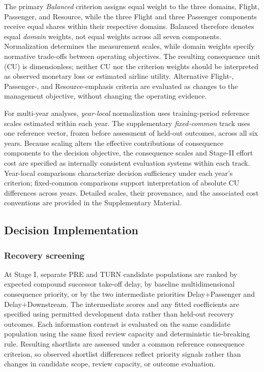The primary \emph{Balanced} criterion assigns equal weight to the three domains, Flight, Passenger, and Resource, while the three Flight and three Passenger components receive equal shares within their respective domains. Balanced therefore denotes equal \emph{domain} weights, not equal weights across all seven components. Normalization determines the measurement scales, while domain weights specify normative trade-offs between operating objectives. The resulting consequence unit (CU) is dimensionless; neither CU nor the criterion weights should be interpreted as observed monetary loss or estimated airline utility. Alternative Flight-, Passenger-, and Resource-emphasis criteria are evaluated as changes to the management objective, without changing the operating evidence.

For multi-year analyses, \emph{year-local} normalization uses training-period reference scales estimated within each year. The supplementary \emph{fixed-common} track uses one reference vector, frozen before assessment of held-out outcomes, across all six years. Because scaling alters the effective contributions of consequence components to the decision objective, the consequence scales and Stage-II effort cost are specified as internally consistent evaluation systems within each track. Year-local comparisons characterize decision sufficiency under each year's criterion; fixed-common comparisons support interpretation of absolute CU differences across years. Detailed scales, their provenance, and the associated cost conventions are provided in the Supplementary Material.

\subsection{Decision Implementation}
\label{subsec:decision_implementation}

\subsubsection{Recovery screening}

At Stage I, separate PRE and TURN candidate populations are ranked by expected compound successor take-off delay, by baseline multidimensional consequence priority, or by the two intermediate priorities Delay+Passenger and Delay+Downstream. The intermediate scores and any fitted coefficients are specified using permitted development data rather than held-out recovery outcomes. Each information contrast is evaluated on the same candidate population using the same fixed review capacity and deterministic tie-breaking rule. Resulting shortlists are assessed under a common reference consequence criterion, so observed shortlist differences reflect priority signals rather than changes in candidate scope, review capacity, or outcome evaluation.


